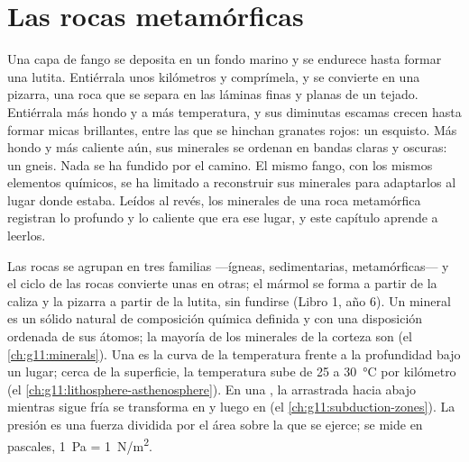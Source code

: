 \chapter{Las rocas metamórficas}\label{ch:g12:metamorphic-rocks}

Una capa de fango se deposita en un fondo marino y se endurece hasta formar
una lutita. Entiérrala unos kilómetros y comprímela, y se convierte en una
pizarra, una roca que se separa en las láminas finas y planas de un tejado.
Entiérrala más hondo y a más temperatura, y sus diminutas escamas crecen hasta
formar micas brillantes, entre las que se hinchan granates rojos: un esquisto.
Más hondo y más caliente aún, sus minerales se ordenan en bandas claras y
oscuras: un gneis. Nada se ha fundido por el camino. El mismo fango, con los
mismos elementos químicos, se ha limitado a reconstruir sus minerales para
adaptarlos al lugar donde estaba. Leídos al revés, los minerales de una roca
metamórfica registran lo profundo y lo caliente que era ese lugar, y este
capítulo aprende a leerlos.

\begin{recall}
Las rocas se agrupan en tres familias ---ígneas, sedimentarias,
metamórficas--- y el ciclo de las rocas convierte unas en otras; el mármol se
forma a partir de la caliza y la pizarra a partir de la lutita, sin fundirse
(Libro 1, año 6). Un mineral es un sólido natural de composición química
definida y con una disposición ordenada de sus átomos; la mayoría de los
minerales de la corteza son 
(el \cref{ch:g11:minerals}). Una  es la curva de la temperatura frente
a la profundidad bajo un lugar; cerca de la superficie, la temperatura sube de
25 a \qty{30}{\celsius} por kilómetro (el \cref{ch:g11:lithosphere-asthenosphere}).
En una , la  arrastrada hacia abajo mientras
sigue fría se transforma en  y luego en  (el
\cref{ch:g11:subduction-zones}). La presión es una fuerza dividida por el área
sobre la que se ejerce; se mide en pascales, \qty{1}{Pa} = \qty{1}{N/m^2}.
\end{recall}

